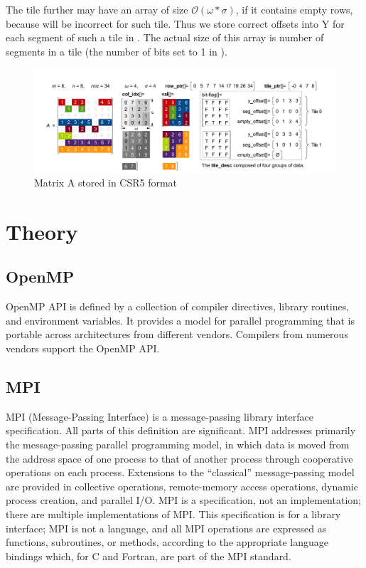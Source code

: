 \documentclass[thesis=M,english]{FITthesis}[2019/12/23]
\begin{document}
The tile further may have an  array of size $\mathcal{O}(\omega * \sigma)$, if it contains empty rows,
because  will be incorrect for such tile. Thus we store correct offsets into Y for each segment of such
a tile in . The actual size of this array is number of segments in a tile (the number of bits set to 1 in ).

\begin{figure}[htp]
    \centering
    \includegraphics[scale=0.35]{static/csr5_do_not_use_remake.png}
    \caption{Matrix A stored in CSR5 format}
\end{figure}

\chapter{Theory}


\section{OpenMP}

OpenMP API is defined by a collection of compiler directives, library routines, and environment variables.
It provides a model for parallel programming that is portable across architectures
from different vendors. Compilers from numerous vendors support the OpenMP API. \cite{openmp18}


\section{MPI}

MPI (Message-Passing Interface) is a message-passing library interface specification.
All parts of this definition are significant. MPI addresses primarily the message-passing parallel
programming model, in which data is moved from the address space of one process to
that of another process through cooperative operations on each process. Extensions to the
“classical” message-passing model are provided in collective operations, remote-memory
access operations, dynamic process creation, and parallel I/O. MPI is a specification, not
an implementation; there are multiple implementations of MPI. This specification is for a
library interface; MPI is not a language, and all MPI operations are expressed as functions,
subroutines, or methods, according to the appropriate language bindings which, for C and
Fortran, are part of the MPI standard.
\cite{mpi40}
\end{document}
